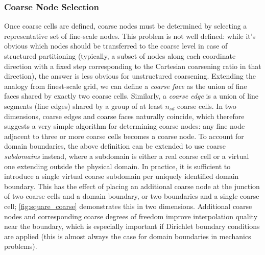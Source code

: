 \subsubsection{Coarse Node Selection}

Once coarse cells are defined, coarse nodes must be determined by selecting a representative set of fine-scale nodes.   This problem is not well defined: while it's obvious which nodes should be transferred to the coarse level in case of structured partitioning (typically, a subset of nodes along each coordinate direction with a fixed step corresponding to the Cartesian coarsening ratio in that direction), the answer is less obvious for unstructured coarsening.   Extending the analogy from finest-scale grid, we can define a \textit{coarse face} as the union of fine faces shared by exactly two coarse cells.   Similarly, a \textit{coarse edge} is a union of line segments (fine edges) shared by a group of at least $n_{sd}$ coarse cells.   In two dimensions, coarse edges and coarse faces naturally coincide, which therefore suggests a very simple algorithm for determining coarse nodes: any fine node adjacent to three or more coarse cells becomes a coarse node.   To account for domain boundaries, the above definition can be extended to use coarse \textit{subdomains} instead, where a subdomain is either a real coarse cell or a virtual one extending outside the physical domain.   In practice, it is sufficient to introduce a single virtual coarse subdomain per uniquely identified domain boundary.   This has the effect of placing an additional coarse node at the junction of two coarse cells and a domain boundary, or two boundaries and a single coarse cell; \autoref{fig:square_coarse} demonstrates this in two dimensions.   Additional coarse nodes and corresponding coarse degrees of freedom improve interpolation quality near the boundary, which is especially important if Dirichlet boundary conditions are applied (this is almost always the case for domain boundaries in mechanics problems).

